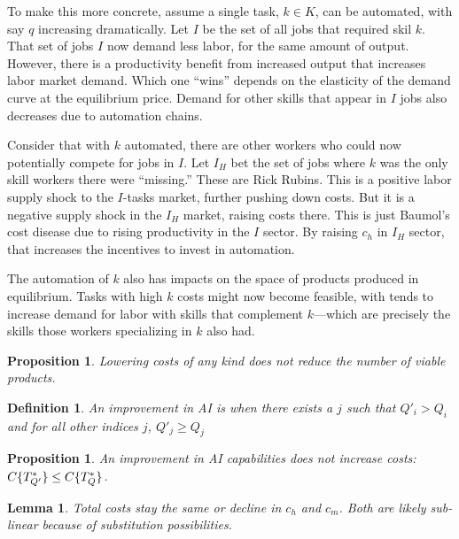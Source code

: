 \documentclass{article}
\newtheorem{proposition}[theorem]{Proposition}
\newtheorem{lemma}[theorem]{Lemma}
\newtheorem{definition}[theorem]{Definition}
\begin{document}
To make this more concrete, assume a single task, $k \in K$, can be automated, with say $q$ increasing dramatically.
Let $I$ be the set of all jobs that required skil $k$.
That set of jobs $I$ now demand less labor, for the same amount of output.
However, there is a productivity benefit from increased output that increases labor market demand.
Which one ``wins'' depends on the elasticity of the demand curve at the equilibrium price.
Demand for other skills that appear in $I$ jobs also decreases due to automation chains.

Consider that with $k$ automated, there are other workers who could now potentially compete for jobs in $I$.
Let $I_H$ bet the set of jobs where $k$ was the only skill workers there were ``missing.''
These are Rick Rubins.
This is a positive labor supply shock to the $I$-tasks market, further pushing down costs.
But it is a negative supply shock in the $I_H$ market, raising costs there.
This is just Baumol's cost disease due to rising productivity in the $I$ sector.
By raising $c_h$ in $I_H$ sector, that increases the incentives to invest in automation.

The automation of $k$ also has impacts on the space of products produced in equilibrium.
Tasks with high $k$ costs might now become feasible, with tends to increase demand for labor with skills that complement $k$---which are precisely the skills those workers specializing in $k$ also had. 


\begin{proposition}
Lowering costs of any kind does not reduce the number of viable products.
\end{proposition}

\begin{definition}
An improvement in AI is when there exists a $j$ such that $Q'_i > Q_i$ and for all other indices $j$, $Q'_j \ge Q_j$
\end{definition}

\begin{proposition}
An improvement in AI capabilities does not increase costs: ${C\{ T^*_{Q'} \} \le C\{ T^*_{Q} \}}$.
\end{proposition}


\begin{lemma}
  Total costs stay the same or decline in $c_h$ and $c_m$.
  Both are likely sub-linear because of substitution possibilities.
\end{lemma}
\end{document}
